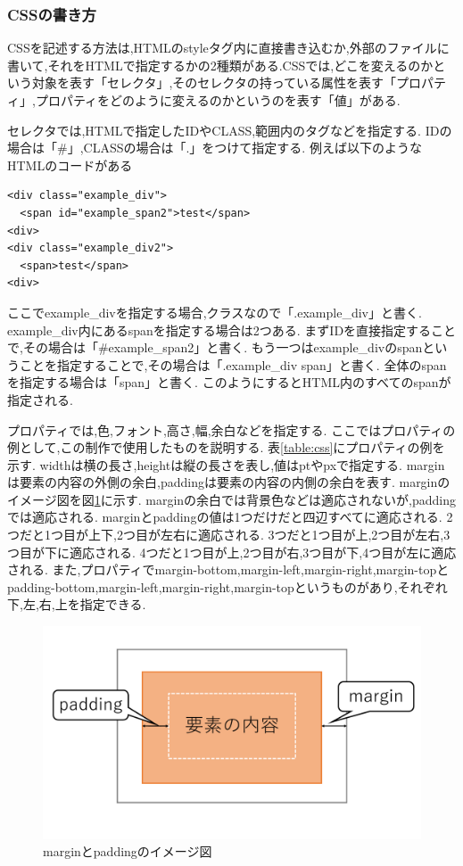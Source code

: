 \documentclass[12pt,a4j,titlepage]{ltjsarticle}
\begin{document}
\subsubsection{CSSの書き方}
CSSを記述する方法は,HTMLのstyleタグ内に直接書き込むか,外部のファイルに書いて,それをHTMLで指定するかの2種類がある.CSSでは,どこを変えるのかという対象を表す「セレクタ」,そのセレクタの持っている属性を表す「プロパティ」,プロパティをどのように変えるのかというのを表す「値」がある.

セレクタでは,HTMLで指定したIDやCLASS,範囲内のタグなどを指定する.
IDの場合は「\#」,CLASSの場合は「.」をつけて指定する.
例えば以下のようなHTMLのコードがある
\begin{lstlisting}
<div class="example_div">
  <span id="example_span2">test</span>
<div>
<div class="example_div2">
  <span>test</span>
<div>
\end{lstlisting}
ここでexample\_divを指定する場合,クラスなので「.example\_div」と書く.
example\_div内にあるspanを指定する場合は2つある.
まずIDを直接指定することで,その場合は「\#example\_span2」と書く.
もう一つはexample\_divのspanということを指定することで,その場合は「.example\_div span」と書く.
全体のspanを指定する場合は「span」と書く.
このようにするとHTML内のすべてのspanが指定される.

プロパティでは,色,フォント,高さ,幅,余白などを指定する.
ここではプロパティの例として,この制作で使用したものを説明する.
表\ref{table:css}にプロパティの例を示す.
widthは横の長さ,heightは縦の長さを表し,値はptやpxで指定する.
marginは要素の内容の外側の余白,paddingは要素の内容の内側の余白を表す.
marginのイメージ図を図\ref{fig:marginpadding}に示す.
marginの余白では背景色などは適応されないが,paddingでは適応される.
marginとpaddingの値は1つだけだと四辺すべてに適応される.
2つだと1つ目が上下,2つ目が左右に適応される.
3つだと1つ目が上,2つ目が左右,3つ目が下に適応される.
4つだと1つ目が上,2つ目が右,3つ目が下,4つ目が左に適応される.
また,プロパティでmargin-bottom,margin-left,margin-right,margin-topとpadding-bottom,margin-left,margin-right,margin-topというものがあり,それぞれ下,左,右,上を指定できる.

\begin{figure}[H]
\centering
 \includegraphics[width=120mm]{./figures/marginpadding.pdf}
 \caption{marginとpaddingのイメージ図}
 \label{fig:marginpadding}
\end{figure}
\end{document}
